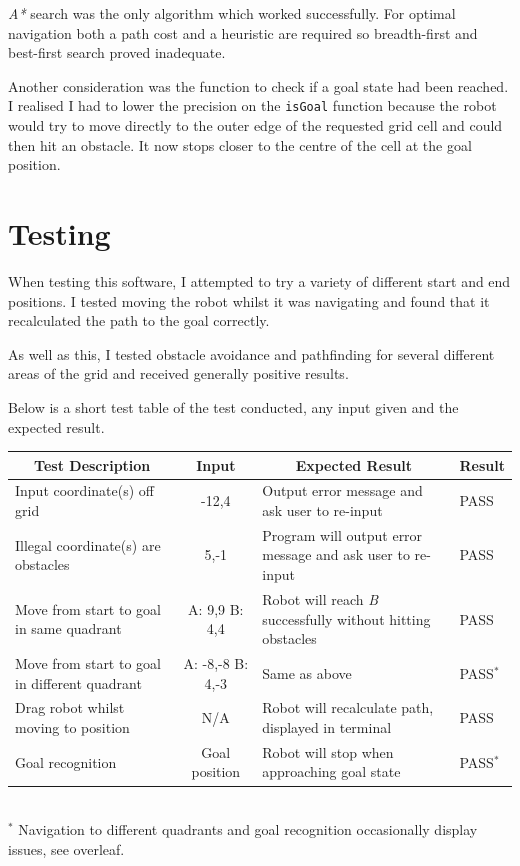 \documentclass[a4paper,12pt]{article}
\begin{document}
\textit{A*} search was the only algorithm which worked successfully. For optimal navigation both a path cost and a heuristic are required so breadth-first and best-first search proved inadequate.

Another consideration was the function to check if a goal state had been reached. I realised I had to lower the precision on the \texttt{isGoal} function because the robot would try to move directly to the outer edge of the requested grid cell and could then hit an obstacle. It now stops closer to the centre of the cell at the goal position.

\section{Testing}
When testing this software, I attempted to try a variety of different start and end positions. I tested moving the robot whilst it was navigating and found that it recalculated the path to the goal correctly. 

As well as this,  I tested obstacle avoidance and pathfinding for several different areas of the grid and received generally positive results.

Below is a short test table of the test conducted, any input given and the expected result.
\begin{table}[ht!]
\scriptsize
    \begin{tabular}{|l|c|l|l|}
        \hline
        \multicolumn{1}{|c|}{\textbf{Test Description}} & \multicolumn{1}{c|}{\textbf{Input}}& \multicolumn{1}{c|}{\textbf{Expected Result}} & \multicolumn{1}{c|}{\textbf{Result}} \\
        \hline
        Input coordinate(s) off grid & -12,4 & Output error message and ask user to re-input & PASS\\
        \hline
        Illegal coordinate(s) are obstacles & 5,-1 & Program will output error message and ask user to re-input & PASS\\
        \hline
        Move from start to goal in same quadrant & A: 9,9 B: 4,4 & Robot will reach \textit{B} successfully without hitting obstacles & PASS\\
        \hline
        Move from start to goal in different quadrant & A: -8,-8 B: 4,-3 & Same as above & PASS$^*$\\
        \hline
        Drag robot whilst moving to position & N/A & Robot will recalculate path, displayed in terminal & PASS\\
        \hline
        Goal recognition & Goal position & Robot will stop when approaching goal state & PASS$^*$\\
        \hline
    \end{tabular}
    \\
$^*$ Navigation to different quadrants and goal recognition occasionally display issues, see overleaf.
\normalsize
\end{table}
\end{document}
